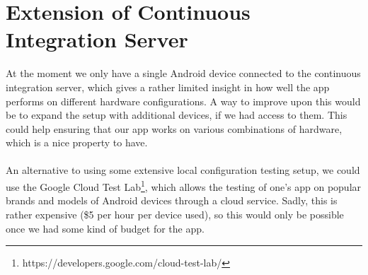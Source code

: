 
\section{Extension of Continuous Integration Server}
\label{sec:extension_of_continuous_integration_server}

At the moment we only have a single Android device connected to the continuous integration server, which gives a rather limited insight in how well the app performs on different hardware configurations. A way to improve upon this would be to expand the setup with additional devices, if we had access to them. This could help ensuring that our app works on various combinations of hardware, which is a nice property to have. 
\\\\
An alternative to using some extensive local configuration testing setup, we could use the Google Cloud Test Lab\footnote{https://developers.google.com/cloud-test-lab/}, which allows the testing of one's app on popular brands and models of Android devices through a cloud service. Sadly, this is rather expensive (\$5 per hour per device used), so this would only be possible once we had some kind of budget for the app. 